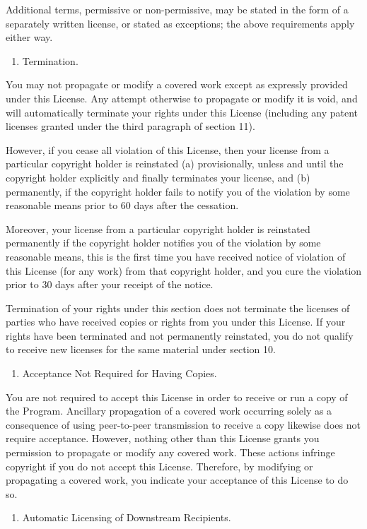 \documentclass[letterpaper,10pt,english]{sphinxmanual}
\begin{document}
Additional terms, permissive or non-permissive, may be stated in the
form of a separately written license, or stated as exceptions;
the above requirements apply either way.
\begin{enumerate}
%
\setcounter{enumi}{7}
\item {} 
Termination.

\end{enumerate}

You may not propagate or modify a covered work except as expressly
provided under this License.  Any attempt otherwise to propagate or
modify it is void, and will automatically terminate your rights under
this License (including any patent licenses granted under the third
paragraph of section 11).

However, if you cease all violation of this License, then your
license from a particular copyright holder is reinstated (a)
provisionally, unless and until the copyright holder explicitly and
finally terminates your license, and (b) permanently, if the copyright
holder fails to notify you of the violation by some reasonable means
prior to 60 days after the cessation.

Moreover, your license from a particular copyright holder is
reinstated permanently if the copyright holder notifies you of the
violation by some reasonable means, this is the first time you have
received notice of violation of this License (for any work) from that
copyright holder, and you cure the violation prior to 30 days after
your receipt of the notice.

Termination of your rights under this section does not terminate the
licenses of parties who have received copies or rights from you under
this License.  If your rights have been terminated and not permanently
reinstated, you do not qualify to receive new licenses for the same
material under section 10.
\begin{enumerate}
%
\setcounter{enumi}{8}
\item {} 
Acceptance Not Required for Having Copies.

\end{enumerate}

You are not required to accept this License in order to receive or
run a copy of the Program.  Ancillary propagation of a covered work
occurring solely as a consequence of using peer-to-peer transmission
to receive a copy likewise does not require acceptance.  However,
nothing other than this License grants you permission to propagate or
modify any covered work.  These actions infringe copyright if you do
not accept this License.  Therefore, by modifying or propagating a
covered work, you indicate your acceptance of this License to do so.
\begin{enumerate}
%
\setcounter{enumi}{9}
\item {} 
Automatic Licensing of Downstream Recipients.

\end{enumerate}
\end{document}
